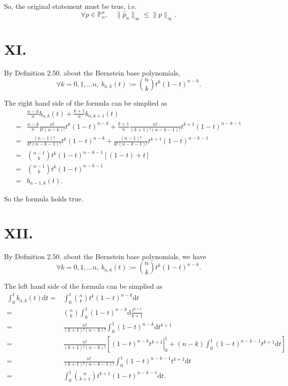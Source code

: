 \documentclass[a4paper]{article}
\begin{document}
So, the original statement must be true, i.e.
$$\forall p\in\mathbb{P}_n^a,\quad\|\hat{p}_n\|_\infty\leq\|p\|_\infty.$$

\section*{XI.}
By Definition 2.50. about the Bernstein base polynomials, 
$$
\forall k = 0, 1, \dots n,\ b_{n, k}(t):=\binom{n}{k}t^k(1-t)^{n-k}.
$$

The right hand side of the formula can be simplied as 
$$
\begin{aligned}
  &\frac{n-k}{n}b_{n,k}(t)+\frac{k+1}{n}b_{n,k+1}(t) \\
  =&\frac{n-k}{n} \frac{n!}{k!(n-k)!} t^k(1-t)^{n-k} + \frac{k+1}{n} \frac{n!}{(k+1)!(n-k-1)!} t^{k+1}(1-t)^{n-k-1} \\
  =&\frac{(n-1)!}{k!(n-k-1)!} t^k(1-t)^{n-k} +\frac{(n-1)!}{k!(n-k-1)!} t^{k+1}(1-t)^{n-k-1} \\
  =&\binom{n-1}{k} t^k(1-t)^{n-k-1}[(1 - t) + t]   \\
  =&\binom{n-1}{k} t^k(1-t)^{n-k-1}  \\
  =&b_{n-1, k}(t).
\end{aligned}
$$

So the formula holds true.

\section*{XII.}
By Definition 2.50. about the Bernstein base polynomials, we have
$$
\forall k = 0, 1, \dots n,\ b_{n, k}(t):=\binom{n}{k}t^k(1-t)^{n-k}.
$$

The left hand side of the formula can be simplied as 
$$
\begin{aligned}
  \int_{0}^{1} b_{n,k}(t) \mathrm{d}t =& \int_{0}^{1} \binom{n}{k}t^k(1-t)^{n-k} \mathrm{d}t \\
  =& \binom{n}{k} \int_{0}^{1} (1-t)^{n-k} \mathrm{d}\frac{t^{k+1}}{k+1} \\
  =& \frac{n!}{(k+1)!(n-k)!} \int_{0}^{1} (1-t)^{n-k} \mathrm{d}t^{k+1} \\
  =& \frac{n!}{(k+1)!(n-k)!} \left[ \left.(1-t)^{n-k}t^{k+1} \right|_{0}^{1} + (n-k)\int_{0}^{1} (1-t)^{n-k-1}t^{k+1} \mathrm{d}t  \right] \\
  =& \frac{n!}{(k+1)!(n-k-1)!} \int_{0}^{1}(1-t)^{n-k-1}t^{k+1}\mathrm{d}t  \\
  =& \int_{0}^{1} \binom{n}{k+1}t^{k+1}(1-t)^{n-k-1}\mathrm{d}t. \\
\end{aligned}
$$
\end{document}
